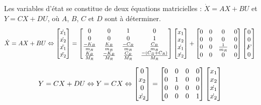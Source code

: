 \documentclass[a4paper,11pt]{article}
\begin{document}
Les variables d'état se constitue de deux équations matricielles : $\dot{X}=AX+BU$ et $Y=CX+DU$, où $A$, $B$, $C$ et $D$ sont à déterminer.
\[
    \dot{X}=AX+BU
    \Leftrightarrow
    \begin{bmatrix}
        \dot{x_{1}}\\
        \dot{x_{2}}\\
        \ddot{x_{1}}\\
        \ddot{x_{2}}
    \end{bmatrix}
    =
    \begin{bmatrix}
        0 & 0 & 1 & 0\\
        0 & 0 & 0 & 1\\
        \frac{-K_{B}}{m_{R}} & \frac{K_{B}}{m_{R}} & \frac{-C_{B}}{m_{R}} & \frac{C_{B}}{m_{R}}\\
        \frac{K_{B}}{M_{R}} & \frac{-K_{B}}{M_{R}} & \frac{C_{B}}{M_{R}} & \frac{-(C_{B}+C_{R})}{M_{R}}\\
    \end{bmatrix}
    \begin{bmatrix}
        x_{1}\\
        x_{2}\\
        \dot{x_{1}}\\
        \dot{x_{2}}
    \end{bmatrix}
    +
    \begin{bmatrix}
        0 & 0 & 0 & 0\\
        0 & 0 & 0 & 0\\
        0 & 0 & \frac{1}{m_{R}} & 0\\
        0 & 0 & 0 & 0\\
    \end{bmatrix}
    \begin{bmatrix}
        0\\
        0\\
        F\\
        0
    \end{bmatrix}\\
\]

\[
    Y=CX+DU
    \Leftrightarrow
    Y=CX
    \Leftrightarrow
    \begin{bmatrix}
        0\\
        x_{2}\\
        0\\
        \dot{x_{2}}
    \end{bmatrix}
    =
    \begin{bmatrix}
        0 & 0 & 0 & 0\\
        0 & 1 & 0 & 0\\
        0 & 0 & 0 & 0\\
        0 & 0 & 0 & 1\\
    \end{bmatrix}
    \begin{bmatrix}
        x_{1}\\
        x_{2}\\
        \dot{x_{1}}\\
        \dot{x_{2}}
    \end{bmatrix}\\
\]
\end{document}
